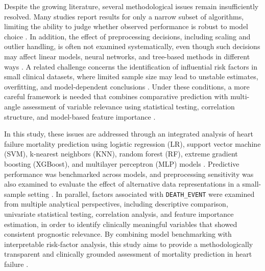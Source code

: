 Despite the growing literature, several methodological issues remain insufficiently resolved. Many studies report results for only a narrow subset of algorithms, limiting the ability to judge whether observed performance is robust to model choice \cite{xu2025meta,hajishah2025meta}. In addition, the effect of preprocessing decisions, including scaling and outlier handling, is often not examined systematically, even though such decisions may affect linear models, neural networks, and tree-based methods in different ways \cite{xu2025meta,collins2024tripodai}. A related challenge concerns the identification of influential risk factors in small clinical datasets, where limited sample size may lead to unstable estimates, overfitting, and model-dependent conclusions \cite{chicco2020survival,moons2025probastai}. Under these conditions, a more careful framework is needed that combines comparative prediction with multi-angle assessment of variable relevance using statistical testing, correlation structure, and model-based feature importance \cite{collins2024tripodai,kundu2021explainable,caterson2024xai}.

In this study, these issues are addressed through an integrated analysis of heart failure mortality prediction using logistic regression (LR), support vector machine (SVM), k-nearest neighbors (KNN), random forest (RF), extreme gradient boosting (XGBoost), and multilayer perceptron (MLP) models \cite{james2021islr,cortes1995svm,cover1967knn,breiman2001rf,chen2016xgboost,hastie2009esl}. Predictive performance was benchmarked across models, and preprocessing sensitivity was also examined to evaluate the effect of alternative data representations in a small-sample setting \cite{xu2025meta,hajishah2025meta}. In parallel, factors associated with \texttt{DEATH\_EVENT} were examined from multiple analytical perspectives, including descriptive comparison, univariate statistical testing, correlation analysis, and feature importance estimation, in order to identify clinically meaningful variables that showed consistent prognostic relevance. By combining model benchmarking with interpretable risk-factor analysis, this study aims to provide a methodologically transparent and clinically grounded assessment of mortality prediction in heart failure \cite{chicco2020survival,collins2024tripodai}.